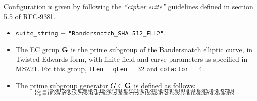 \documentclass[
]{article}
\begin{document}
Configuration is given by following the \emph{``cipher suite''}
guidelines defined in section 5.5 of
\href{https://datatracker.ietf.org/doc/rfc9381}{RFC-9381}.

\begin{itemize}
\item
  \texttt{suite\_string} = \texttt{"Bandersnatch\_SHA-512\_ELL2"}.
\item
  The EC group \(\bold{G}\) is the prime subgroup of the Bandersnatch
  elliptic curve, in Twisted Edwards form, with finite field and curve
  parameters as specified in
  \href{https://eprint.iacr.org/2021/1152}{MSZ21}. For this group,
  \texttt{fLen} = \texttt{qLen} = \(32\) and \texttt{cofactor} = \(4\).
\item
  The prime subgroup generator \(G \in \bold{G}\) is defined as follows:
  \[_{G_x = 18886178867200960497001835917649091219057080094937609519140440539760939937304}\]
  \[_{G_y = 19188667384257783945677642223292697773471335439753913231509108946878080696678}\]


\end{itemize}
\end{document}
